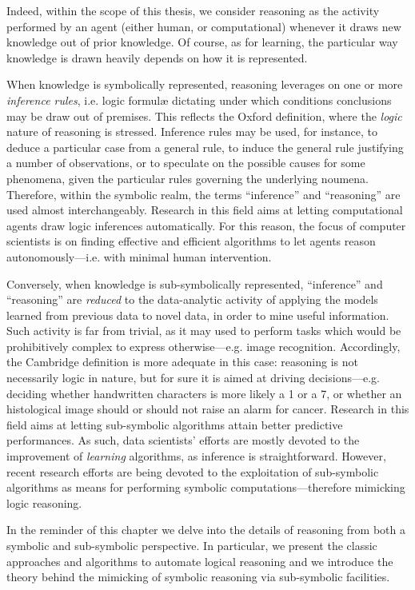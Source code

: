 \documentclass[12pt,a4paper,openright,twoside]{book}
\begin{document}
Indeed, within the scope of this thesis, we consider reasoning as the activity performed by an agent (either human, or computational) whenever it draws new knowledge out of prior knowledge.
%
Of course, as for learning, the particular way knowledge is drawn heavily depends on how it is represented.

When knowledge is symbolically represented, reasoning leverages on one or more \emph{inference rules}, i.e. logic formul\ae{} dictating under which conditions conclusions may be draw out of premises.
%
This reflects the Oxford definition, where the \emph{logic} nature of reasoning is stressed.
%
Inference rules may be used, for instance, to deduce a particular case from a general rule, to induce the general rule justifying a number of observations, or to speculate on the possible causes for some phenomena, given the particular rules governing the underlying noumena.
%
Therefore, within the symbolic realm, the terms ``inference'' and ``reasoning'' are used almost interchangeably.
%
Research in this field aims at letting computational agents draw logic inferences automatically.
%
For this reason, the focus of computer scientists is on finding effective and efficient algorithms to let agents reason autonomously---i.e. with minimal human intervention.

Conversely, when knowledge is sub-symbolically represented, ``inference'' and ``reasoning'' are \emph{reduced} to the data-analytic activity of applying the models learned from previous data to novel data, in order to mine useful information.
%
Such activity is far from trivial, as it may used to perform tasks which would be prohibitively complex to express otherwise---e.g. image recognition.
%
Accordingly, the Cambridge definition is more adequate in this case: reasoning is not necessarily logic in nature, but for sure it is aimed at driving decisions---e.g. deciding whether handwritten characters is more likely a 1 or a 7, or whether an histological image should or should not raise an alarm for cancer.
%
Research in this field aims at letting sub-symbolic algorithms attain better predictive performances.
%
As such, data scientists' efforts are mostly devoted to the improvement of \emph{learning} algorithms, as inference is straightforward.
%
However, recent research efforts are being devoted to the exploitation of sub-symbolic algorithms as means for performing symbolic computations---therefore mimicking logic reasoning.

In the reminder of this chapter we delve into the details of reasoning from both a symbolic and sub-symbolic perspective.
%
In particular, we present the classic approaches and algorithms to automate logical reasoning and we introduce the theory behind the mimicking of symbolic reasoning via sub-symbolic facilities.
\end{document}

